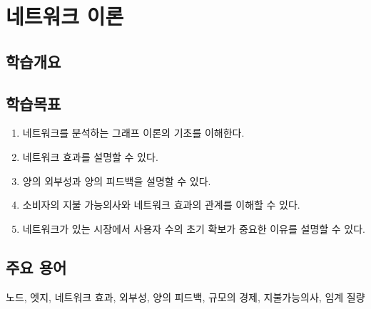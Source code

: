 \chapter{네트워크 이론}\label{cha:networktheory}

\section*{학습개요}

\section*{학습목표}
\begin{enumerate}
\item 네트워크를 분석하는 그래프 이론의 기초를 이해한다.
\item 네트워크 효과를 설명할 수 있다.
\item 양의 외부성과 양의 피드백을 설명할 수 있다.
\item 소비자의 지불 가능의사와 네트워크 효과의 관계를 이해할 수 있다.
\item 네트워크가 있는 시장에서 사용자 수의 초기 확보가 중요한 이유를 설명할 수 있다.
\end{enumerate}

\section*{주요 용어}
노드, 엣지,  네트워크 효과, 외부성, 양의 피드백, 규모의 경제, 지불가능의사, 임계 질량


\pagebreak


